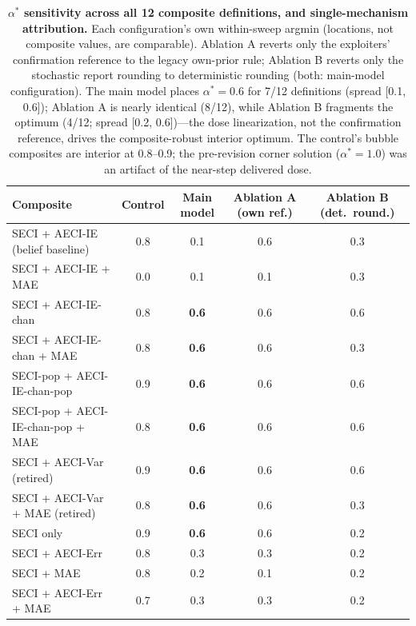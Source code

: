 \documentclass[11pt]{article}
\begin{document}
\begin{table}[h!]
\centering
\caption{\textbf{$\alpha^{*}$ sensitivity across all 12 composite
definitions, and single-mechanism attribution.} Each configuration's own
within-sweep argmin (locations, not composite values, are comparable).
Ablation A reverts only the exploiters' confirmation reference to the
legacy own-prior rule; Ablation B reverts only the stochastic report
rounding to deterministic rounding (both: main-model configuration).
The main model places $\alpha^{*} = 0.6$ for 7/12 definitions (spread
[0.1, 0.6]); Ablation A is nearly identical (8/12), while Ablation B
fragments the optimum (4/12; spread [0.2, 0.6])---the dose
linearization, not the confirmation reference, drives the composite-robust
interior optimum. The control's bubble composites are interior at
0.8--0.9; the pre-revision corner solution ($\alpha^{*} = 1.0$) was an
artifact of the near-step delivered dose.}\label{tab:s2-astar}
\small
\begin{tabular}{@{}lcccc@{}}
\toprule
Composite & Control & Main model & Ablation A (own ref.) & Ablation B (det.\ round.) \\
\midrule
SECI + AECI-IE (belief baseline)        & 0.8 & 0.1 & 0.6 & 0.3 \\
SECI + AECI-IE + MAE                     & 0.0 & 0.1 & 0.1 & 0.3 \\
SECI + AECI-IE-chan                      & 0.8 & \textbf{0.6} & 0.6 & 0.6 \\
SECI + AECI-IE-chan + MAE                & 0.8 & \textbf{0.6} & 0.6 & 0.3 \\
SECI-pop + AECI-IE-chan-pop              & 0.9 & \textbf{0.6} & 0.6 & 0.6 \\
SECI-pop + AECI-IE-chan-pop + MAE        & 0.8 & \textbf{0.6} & 0.6 & 0.6 \\
SECI + AECI-Var (retired)                & 0.9 & \textbf{0.6} & 0.6 & 0.6 \\
SECI + AECI-Var + MAE (retired)          & 0.8 & \textbf{0.6} & 0.6 & 0.3 \\
SECI only                                & 0.9 & \textbf{0.6} & 0.6 & 0.2 \\
SECI + AECI-Err                          & 0.8 & 0.3 & 0.3 & 0.2 \\
SECI + MAE                               & 0.8 & 0.2 & 0.1 & 0.2 \\
SECI + AECI-Err + MAE                    & 0.7 & 0.3 & 0.3 & 0.2 \\
\bottomrule
\end{tabular}
\end{table}
\end{document}
